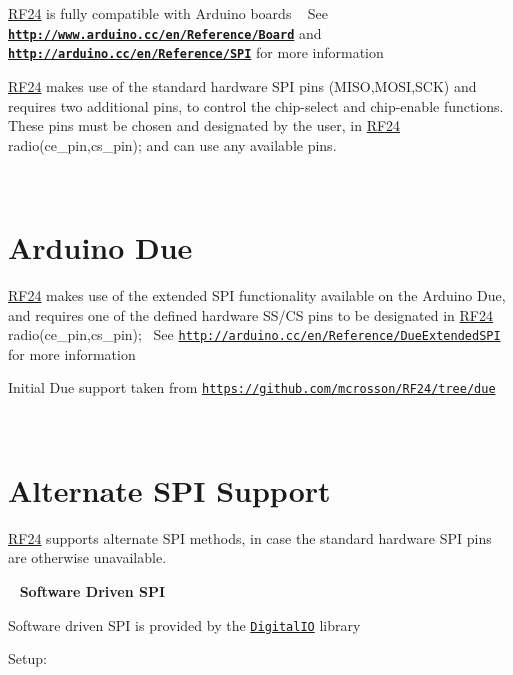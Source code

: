 \hyperlink{classRF24}{R\+F24} is fully compatible with Arduino boards ~\newline
 See {\bfseries  \href{http://www.arduino.cc/en/Reference/Board}{\tt http\+://www.\+arduino.\+cc/en/\+Reference/\+Board} } and {\bfseries  \href{http://arduino.cc/en/Reference/SPI}{\tt http\+://arduino.\+cc/en/\+Reference/\+S\+PI} } for more information

\hyperlink{classRF24}{R\+F24} makes use of the standard hardware S\+PI pins (M\+I\+SO,M\+O\+SI,S\+CK) and requires two additional pins, to control the chip-\/select and chip-\/enable functions.~\newline
 These pins must be chosen and designated by the user, in \hyperlink{classRF24}{R\+F24} radio(ce\+\_\+pin,cs\+\_\+pin); and can use any available pins.

~\newline
 \hypertarget{Arduino_ARD_DUE}{}\section{Arduino Due}\label{Arduino_ARD_DUE}
\hyperlink{classRF24}{R\+F24} makes use of the extended S\+PI functionality available on the Arduino Due, and requires one of the defined hardware S\+S/\+CS pins to be designated in \hyperlink{classRF24}{R\+F24} radio(ce\+\_\+pin,cs\+\_\+pin);~\newline
 See \href{http://arduino.cc/en/Reference/DueExtendedSPI}{\tt http\+://arduino.\+cc/en/\+Reference/\+Due\+Extended\+S\+PI} for more information

Initial Due support taken from \href{https://github.com/mcrosson/RF24/tree/due}{\tt https\+://github.\+com/mcrosson/\+R\+F24/tree/due}

~\newline
 \hypertarget{Arduino_Alternate_SPI}{}\section{Alternate S\+P\+I Support}\label{Arduino_Alternate_SPI}
\hyperlink{classRF24}{R\+F24} supports alternate S\+PI methods, in case the standard hardware S\+PI pins are otherwise unavailable.

~\newline
 {\bfseries Software Driven S\+PI}

Software driven S\+PI is provided by the \href{https://github.com/greiman/DigitalIO}{\tt Digital\+IO} library

Setup\+:~\newline

